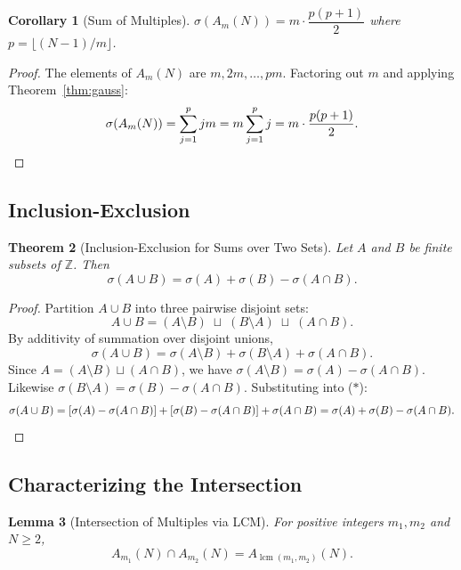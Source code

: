 \documentclass[11pt]{article}
\newtheorem{theorem}{Theorem}
\newtheorem{lemma}[theorem]{Lemma}
\newtheorem{corollary}[theorem]{Corollary}
\begin{document}
\begin{corollary}[Sum of Multiples]
\label{cor:sum-mult}
$\sigma(A_m(N)) = m \cdot \dfrac{p(p+1)}{2}$ where $p = \lfloor (N-1)/m \rfloor$.
\end{corollary}

\begin{proof}
The elements of $A_m(N)$ are $m, 2m, \ldots, pm$. Factoring out $m$ and applying Theorem~\ref{thm:gauss}:
\[
\sigma(A_m(N)) = \sum_{j=1}^{p} jm = m \sum_{j=1}^{p} j = m \cdot \frac{p(p+1)}{2}. \qedhere
\]
\end{proof}

\subsection{Inclusion-Exclusion}

\begin{theorem}[Inclusion-Exclusion for Sums over Two Sets]
\label{thm:ie}
Let $A$ and $B$ be finite subsets of $\mathbb{Z}$. Then
\[
\sigma(A \cup B) = \sigma(A) + \sigma(B) - \sigma(A \cap B).
\]
\end{theorem}

\begin{proof}
Partition $A \cup B$ into three pairwise disjoint sets:
\[
A \cup B = (A \setminus B) \;\sqcup\; (B \setminus A) \;\sqcup\; (A \cap B).
\]
By additivity of summation over disjoint unions,
\begin{equation}
\sigma(A \cup B) = \sigma(A \setminus B) + \sigma(B \setminus A) + \sigma(A \cap B). \tag{$\ast$}
\end{equation}
Since $A = (A \setminus B) \sqcup (A \cap B)$, we have $\sigma(A \setminus B) = \sigma(A) - \sigma(A \cap B)$. Likewise $\sigma(B \setminus A) = \sigma(B) - \sigma(A \cap B)$. Substituting into ($\ast$):
\[
\sigma(A \cup B) = [\sigma(A) - \sigma(A \cap B)] + [\sigma(B) - \sigma(A \cap B)] + \sigma(A \cap B) = \sigma(A) + \sigma(B) - \sigma(A \cap B). \qedhere
\]
\end{proof}

\subsection{Characterizing the Intersection}

\begin{lemma}[Intersection of Multiples via LCM]
\label{lem:lcm}
For positive integers $m_1, m_2$ and $N \ge 2$,
\[
A_{m_1}(N) \cap A_{m_2}(N) = A_{\operatorname{lcm}(m_1, m_2)}(N).
\]
\end{lemma}
\end{document}
